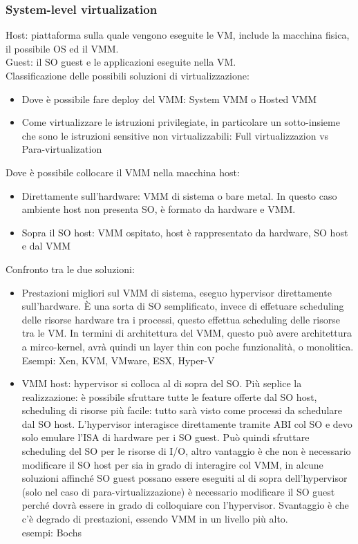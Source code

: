 \documentclass{article}
\begin{document}
\subsubsection{System-level virtualization}
Host: piattaforma sulla quale vengono eseguite le VM, include la macchina fisica, il possibile OS ed il VMM.\\ Guest: il SO guest e le applicazioni eseguite nella VM.\\ Classificazione delle possibili soluzioni di virtualizzazione:
\begin{itemize}
\item Dove è possibile fare deploy del VMM: System VMM o Hosted VMM
\item Come virtualizzare le istruzioni privilegiate, in particolare un sotto-insieme che sono le istruzioni sensitive non virtualizzabili: Full virtualizzazion vs Para-virtualization
\end{itemize}
Dove è possibile collocare il VMM nella macchina host:
\begin{itemize}
\item Direttamente sull'hardware: VMM di sistema o bare metal. In questo caso ambiente host non presenta SO, è formato da hardware e VMM.
\item Sopra il SO host: VMM ospitato, host è rappresentato da hardware, SO host e dal VMM
\end{itemize}
Confronto tra le due soluzioni:
\begin{itemize}
\item Prestazioni migliori sul VMM di sistema, eseguo hypervisor direttamente sull'hardware. È una sorta di SO semplificato, invece di effetuare scheduling delle risorse hardware tra i processi, questo effettua scheduling delle risorse tra le VM. In termini di architettura del VMM, questo può avere architettura a mirco-kernel, avrà quindi un layer thin con poche funzionalità, o monolitica. Esempi: Xen, KVM, VMware, ESX, Hyper-V
\item VMM host: hypervisor si colloca al di sopra del SO. Più seplice la realizzazione: è possibile sfruttare tutte le feature offerte dal SO host, scheduling di risorse più facile: tutto sarà visto come processi da schedulare dal SO host. L'hypervisor interagisce direttamente tramite ABI col SO e devo solo emulare l'ISA di hardware per i SO guest. Può quindi sfruttare scheduling del SO per le risorse di I/O, altro vantaggio è che non è necessario modificare il SO host per sia in grado di interagire col VMM, in alcune soluzioni affinché SO guest possano essere eseguiti al di sopra dell'hypervisor (solo nel caso di para-virtualizzazione) è necessario modificare il SO guest perché dovrà essere in grado di colloquiare con l'hypervisor. Svantaggio è che c'è degrado di prestazioni, essendo VMM in un livello più alto.\\ esempi: Bochs
\end{itemize}
\end{document}
